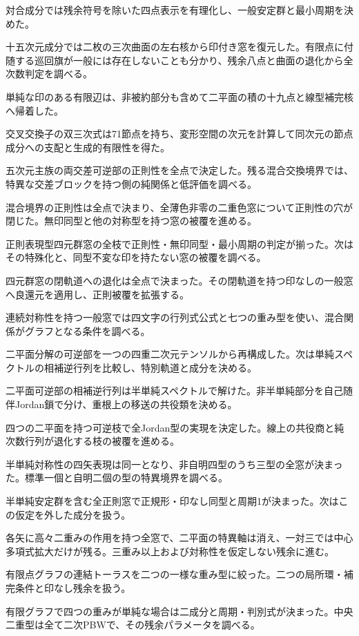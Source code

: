 \documentclass[11pt,a4paper]{ltjsarticle}
\begin{document}
対合成分では残余符号を除いた四点表示を有理化し、一般安定群と最小周期を決めた。

十五次元成分では二枚の三次曲面の左右核から印付き窓を復元した。有限点に付随する巡回旗が一般には存在しないことも分かり、残余八点と曲面の退化から全次数判定を調べる。

単純な印のある有限辺は、非被約部分も含めて二平面の積の十九点と線型補完核へ帰着した。

交叉交換子の双三次式は71節点を持ち、変形空間の次元を計算して同次元の節点成分への支配と生成的有限性を得た。

五次元主族の両交差可逆部の正則性を全点で決定した。残る混合交換境界では、特異な交差ブロックを持つ側の純関係と低評価を調べる。

混合境界の正則性は全点で決まり、全薄色非零の二重色窓について正則性の穴が閉じた。無印同型と他の対称型を持つ窓の被覆を進める。

正則表現型四元群窓の全枝で正則性・無印同型・最小周期の判定が揃った。次はその特殊化と、同型不変な印を持たない窓の被覆を調べる。

四元群窓の閉軌道への退化は全点で決まった。その閉軌道を持つ印なしの一般窓へ良還元を適用し、正則被覆を拡張する。

連続対称性を持つ一般窓では四文字の行列式公式と七つの重み型を使い、混合関係がグラフとなる条件を調べる。

二平面分解の可逆部を一つの四重二次元テンソルから再構成した。次は単純スペクトルの相補逆行列を比較し、特別軌道と成分を決める。

二平面可逆部の相補逆行列は半単純スペクトルで解けた。非半単純部分を自己随伴Jordan鎖で分け、重根上の移送の共役類を決める。

四つの二平面を持つ可逆枝で全Jordan型の実現を決定した。線上の共役商と純次数行列が退化する枝の被覆を進める。

半単純対称性の四矢表現は同一となり、非自明四型のうち三型の全窓が決まった。標準一個と自明二個の型の特異境界を調べる。

半単純安定群を含む全正則窓で正規形・印なし同型と周期1が決まった。次はこの仮定を外した成分を扱う。

各矢に高々二重みの作用を持つ全窓で、二平面の特異軸は消え、一対三では中心多項式拡大だけが残る。三重み以上および対称性を仮定しない残余に進む。

有限点グラフの連結トーラスを二つの一様な重み型に絞った。二つの局所環・補完条件と印なし残余を扱う。

有限グラフで四つの重みが単純な場合は二成分と周期・判別式が決まった。中央二重型は全て二次PBWで、その残余パラメータを調べる。
\end{document}
